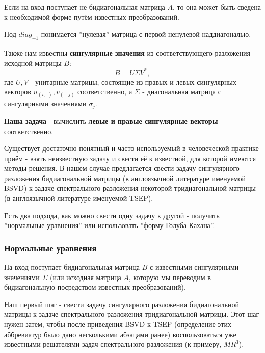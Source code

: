 \begin{note}
    Если на вход поступает не бидиагональная матрица \(A\), то она может быть сведена к необходимой форме путём известных преобразований.
\end{note}

\begin{note}
    Под \(diag_{+1}\) понимается ''нулевая'' матрица с первой ненулевой наддиагональю.
\end{note}

Также нам известны \textbf{сингулярные значения} из соответствующего разложения исходной матрицы \(B\):
\begin{equation}
        B=U \Sigma V^*,
\end{equation}
где $U,V$ - унитарные матрицы, состоящие из правых и левых сингулярных векторов $u_{(i,:)},v_{(:,j)}$ соответственно, а $\Sigma$ - диагональная матрица с сингулярными значениями \(\sigma_j\).

\textbf{Наша задача} - вычислить \textbf{левые и правые сингулярные векторы} соответственно.

Существует достаточно понятный и часто используемый в человеческой практике приём - взять неизвестную задачу и свести её к известной, для которой имеются методы решения. В нашем случае предлагается свести задачу сингулярного разложения бидиагональной матрицы (в англоязычной литературе именуемой BSVD) к задаче спектрального разложения некоторой тридиагональной матрицы (в англоязычной литературе именуемой TSEP).

Есть два подхода, как можно свести одну задачу к другой - получить ''нормальные уравнения'' или использовать ''форму Голуба-Кахана''.



\subsubsection{Нормальные уравнения}
На вход поступает бидиагональная матрица $B$ с известными сингулярными значениями $\Sigma$ (или исходная матрица $A$, которую мы переводим в бидиагональную посредством известных преобразований).

Наш первый шаг - свести задачу сингулярного разложения бидиагональной матрицы к задаче спектрального разложения тридиагональной матрицы. Этот шаг нужен затем, чтобы после приведения BSVD к TSEP (определение этих аббревиатур было дано несколькими абзацами ранее)  воспользоваться уже известными решателями задач спектрального разложения (к примеру, $MR^3$).

